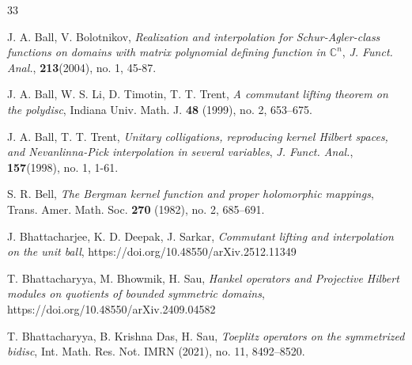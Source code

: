 \documentclass[12pt,reqno]{amsart}
\theoremstyle{remark}
\theoremstyle{definition}
\begin{document}
\begin{thebibliography}{33}




 J. A. Ball, V. Bolotnikov, \emph{Realization and interpolation for Schur-Agler-class functions on domains with matrix polynomial defining function in $\mathbb C^n$}, \textit{J. Funct. Anal.}, {\bf 213}(2004), no. 1, 45-87.

 J. A. Ball, W. S. Li, D. Timotin, T. T. Trent, 
\emph{A commutant lifting theorem on the polydisc},
Indiana Univ. Math. J. {\bf 48} (1999), no. 2, 653–675.



 J. A. Ball, T. T. Trent, \emph{Unitary colligations, reproducing kernel Hilbert spaces, and Nevanlinna-Pick interpolation in several variables}, \textit{J. Funct. Anal.}, {\bf 157}(1998), no. 1, 1-61.


 S. R. Bell, \emph{The Bergman kernel function and proper holomorphic mappings}, Trans. Amer. Math. Soc. {\bf 270} (1982), no. 2, 685–691.

 J. Bhattacharjee, K. D. Deepak, J. Sarkar, \emph{Commutant lifting and interpolation on the unit ball},  https://doi.org/10.48550/arXiv.2512.11349

 T. Bhattacharyya, M. Bhowmik, H. Sau, \emph{Hankel operators and Projective Hilbert modules on quotients of bounded symmetric domains}, https://doi.org/10.48550/arXiv.2409.04582

 T. Bhattacharyya, B. Krishna Das, H. Sau, \emph{Toeplitz operators on the symmetrized bidisc}, Int. Math. Res. Not. IMRN (2021), no. 11, 8492–8520.




\end{thebibliography}
\end{document}
